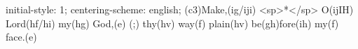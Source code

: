 initial-style: 1;
centering-scheme: english;
(c3)Make,(ig/iji) <sp>*</sp> O(ijIH) Lord(hf/hi) my(hg) God,(e) (;) thy(hv) way(f) plain(hv) be(gh)fore(ih) my(f) face.(e)
